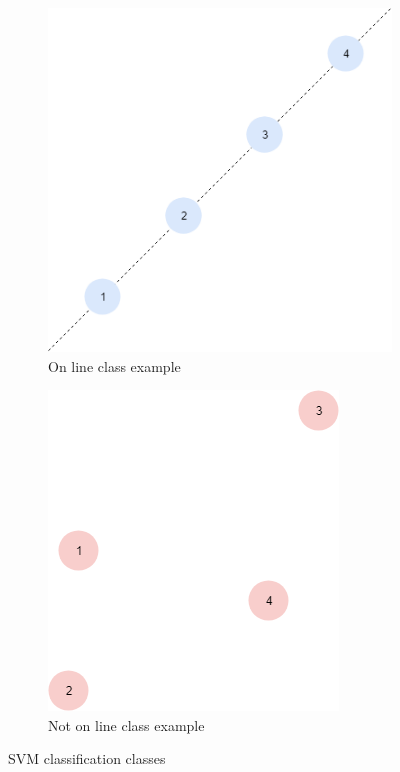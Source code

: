 \begin{figure}[!h]
\centering
\begin{subfigure}{.4\textwidth}
  \centering
  \includegraphics[width=1.0\linewidth]{chapters/images/svm_class1.PNG}
  \caption{On line class example}
  \label{fig:svm_class2}
\end{subfigure}%
\begin{subfigure}{.37\textwidth}
  \centering
  \includegraphics[width=1.0\linewidth]{chapters/images/svm_class2.PNG}
  \caption{Not on line class example }
  \label{fig:svm_class1}
\end{subfigure}
\caption{SVM classification classes}
\label{fig:svm_classes}
\end{figure}

